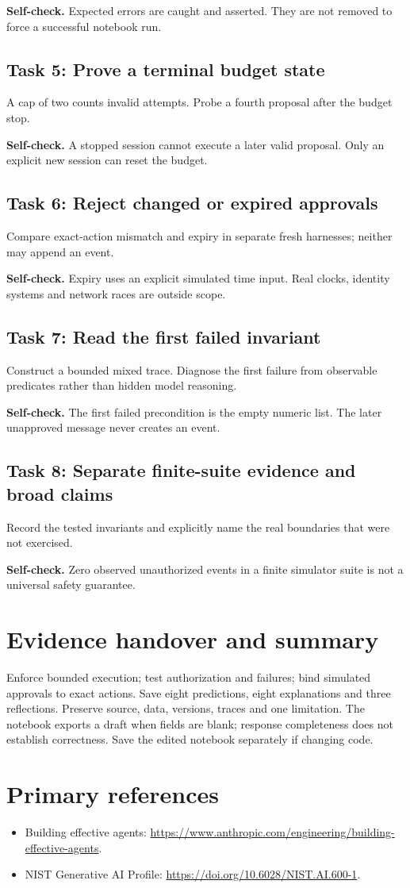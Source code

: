 \textbf{Self-check.} Expected errors are caught and asserted. They are not removed to force a successful notebook run.
\subsection{Task 5: Prove a terminal budget state}
A cap of two counts invalid attempts. Probe a fourth proposal after the budget stop.

\textbf{Self-check.} A stopped session cannot execute a later valid proposal. Only an explicit new session can reset the budget.
\subsection{Task 6: Reject changed or expired approvals}
Compare exact-action mismatch and expiry in separate fresh harnesses; neither may append an event.

\textbf{Self-check.} Expiry uses an explicit simulated time input. Real clocks, identity systems and network races are outside scope.
\subsection{Task 7: Read the first failed invariant}
Construct a bounded mixed trace. Diagnose the first failure from observable predicates rather than hidden model reasoning.

\textbf{Self-check.} The first failed precondition is the empty numeric list. The later unapproved message never creates an event.
\subsection{Task 8: Separate finite-suite evidence and broad claims}
Record the tested invariants and explicitly name the real boundaries that were not exercised.

\textbf{Self-check.} Zero observed unauthorized events in a finite simulator suite is not a universal safety guarantee.
\section{Evidence handover and summary}
Enforce bounded execution; test authorization and failures; bind simulated approvals to exact actions. Save eight predictions, eight explanations and three reflections. Preserve source, data, versions, traces and one limitation. The notebook exports a draft when fields are blank; response completeness does not establish correctness. Save the edited notebook separately if changing code.
\section{Primary references}
\begin{itemize}
\item Building effective agents: \url{https://www.anthropic.com/engineering/building-effective-agents}.
\item NIST Generative AI Profile: \url{https://doi.org/10.6028/NIST.AI.600-1}.
\end{itemize}
